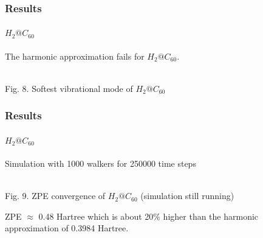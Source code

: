 \documentclass[16pt]{beamer}
\begin{document}
\begin{frame}
\frametitle{Results}
\framesubtitle{$H_2@C_{60}$}
The harmonic approximation fails for $H_2@C_{60}$.
\begin{center}
\\
Fig. 8. Softest vibrational mode of $H_2@C_{60}$
\end{center}
\end{frame}

\begin{frame}
\frametitle{Results}
\framesubtitle{$H_2@C_{60}$}
Simulation with 1000 walkers for 250000 time steps
\begin{center}
\\
Fig. 9. ZPE convergence of $H_2@C_{60}$ (simulation still running)
\end{center}
ZPE $\approx$ 0.48 Hartree which is about 20\% higher than the harmonic approximation of 0.3984 Hartree.

\end{frame}
\end{document}
